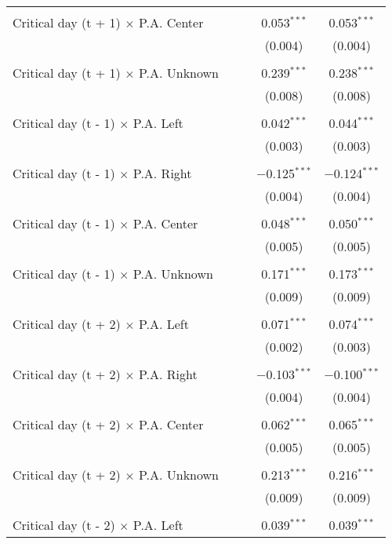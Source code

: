 \documentclass[
]{article}
\begin{document}
\begin{table}[!htbp]
{\begin{tabular}{@{\extracolsep{5pt}}lcccc}
  & & & & \\ 
 Critical day (t + 1) $\times$ P.A. Center &  &  & 0.053$^{***}$ & 0.053$^{***}$ \\ 
  &  &  & (0.004) & (0.004) \\ 
  & & & & \\ 
 Critical day (t + 1) $\times$ P.A. Unknown &  &  & 0.239$^{***}$ & 0.238$^{***}$ \\ 
  &  &  & (0.008) & (0.008) \\ 
  & & & & \\ 
 Critical day (t - 1) $\times$ P.A. Left &  &  & 0.042$^{***}$ & 0.044$^{***}$ \\ 
  &  &  & (0.003) & (0.003) \\ 
  & & & & \\ 
 Critical day (t - 1) $\times$ P.A. Right &  &  & $-$0.125$^{***}$ & $-$0.124$^{***}$ \\ 
  &  &  & (0.004) & (0.004) \\ 
  & & & & \\ 
 Critical day (t - 1) $\times$ P.A. Center &  &  & 0.048$^{***}$ & 0.050$^{***}$ \\ 
  &  &  & (0.005) & (0.005) \\ 
  & & & & \\ 
 Critical day (t - 1) $\times$ P.A. Unknown &  &  & 0.171$^{***}$ & 0.173$^{***}$ \\ 
  &  &  & (0.009) & (0.009) \\ 
  & & & & \\ 
 Critical day (t + 2) $\times$ P.A. Left &  &  & 0.071$^{***}$ & 0.074$^{***}$ \\ 
  &  &  & (0.002) & (0.003) \\ 
  & & & & \\ 
 Critical day (t + 2) $\times$ P.A. Right &  &  & $-$0.103$^{***}$ & $-$0.100$^{***}$ \\ 
  &  &  & (0.004) & (0.004) \\ 
  & & & & \\ 
 Critical day (t + 2) $\times$ P.A. Center &  &  & 0.062$^{***}$ & 0.065$^{***}$ \\ 
  &  &  & (0.005) & (0.005) \\ 
  & & & & \\ 
 Critical day (t + 2) $\times$ P.A. Unknown &  &  & 0.213$^{***}$ & 0.216$^{***}$ \\ 
  &  &  & (0.009) & (0.009) \\ 
  & & & & \\ 
 Critical day (t - 2) $\times$ P.A. Left &  &  & 0.039$^{***}$ & 0.039$^{***}$ \\ 

\end{tabular}}
\end{table}
\end{document}
